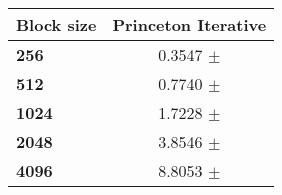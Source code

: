 \begin{tabular}{lc}\toprule
\textbf{Block size}  & \textbf{Princeton Iterative}\\\midrule
\textbf{256}  & 0.3547 $\pm$ \\
\textbf{512}  & 0.7740 $\pm$ \\
\textbf{1024}  & 1.7228 $\pm$ \\
\textbf{2048}  & 3.8546 $\pm$ \\
\textbf{4096} & 8.8053 $\pm$ \\
\bottomrule
\end{tabular}
